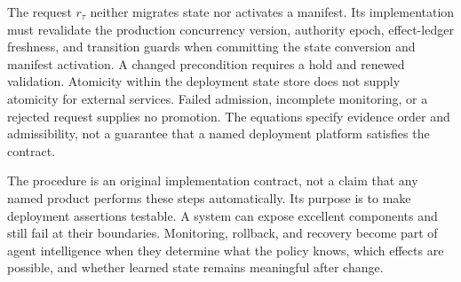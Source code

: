The request $r_\tau$ neither migrates state nor activates a manifest. Its implementation must revalidate the production concurrency version, authority epoch, effect-ledger freshness, and transition guards when committing the state conversion and manifest activation. A changed precondition requires a hold and renewed validation. Atomicity within the deployment state store does not supply atomicity for external services. Failed admission, incomplete monitoring, or a rejected request supplies no promotion. The equations specify evidence order and admissibility, not a guarantee that a named deployment platform satisfies the contract.

The procedure is an original implementation contract, not a claim that any named product performs these steps automatically. Its purpose is to make deployment assertions testable. A system can expose excellent components and still fail at their boundaries. Monitoring, rollback, and recovery become part of agent intelligence when they determine what the policy knows, which effects are possible, and whether learned state remains meaningful after change.
